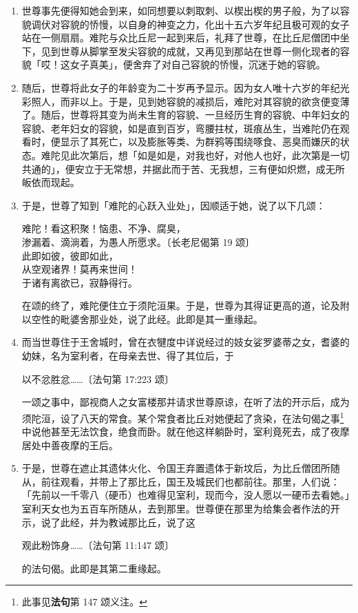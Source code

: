 \begin{enumerate}
\item 世尊事先便得知她会到来，如同想要以刺取刺、以楔出楔的男子般，为了以容貌调伏对容貌的㤭慢，以自身的神变之力，化出十五六岁年纪且极可观的女子站在一侧扇扇。难陀与众比丘尼一起到来后，礼拜了世尊，在比丘尼僧团中坐下，见到世尊从脚掌至发尖容貌的成就，又再见到那站在世尊一侧化现者的容貌「哎！这女子真美」，便舍弃了对自己容貌的㤭慢，沉迷于她的容貌。
\item 随后，世尊将此女子的年龄变为二十岁再予显示。因为女人唯十六岁的年纪光彩照人，而非以上。于是，见到她容貌的减损后，难陀对其容貌的欲贪便变薄了。随后，世尊将其变为尚未生育的容貌、一旦经历生育的容貌、中年妇女的容貌、老年妇女的容貌，如是直到百岁，弯腰拄杖，斑痕丛生，当难陀仍在观看时，便显示了其死亡，以及膨胀等类、为群鸦等围绕啄食、恶臭而嫌厌的状态。难陀见此次第后，想「如是如是，对我也好，对他人也好，此次第是一切共通的」，便安立于无常想，并据此而于苦、无我想，三有便如炽燃，成无所皈依而现起。
\item 于是，世尊了知到「难陀的心跃入业处」，因顺适于她，说了以下几颂：\begin{quoting}难陀！看这积聚！恼患、不净、腐臭，\\渗漏着、滴淌着，为愚人所愿求。{\bluefootnotesize 〔长老尼偈第 19 颂〕}\\此即如彼，彼即如此，\\从空观诸界！莫再来世间！\\于诸有离欲已，寂静得行。\end{quoting}在颂的终了，难陀便住立于须陀洹果。于是，世尊为其得证更高的道，论及附以空性的毗婆舍那业处，说了此经。此即是其一重缘起。
\item 而当世尊住于王舍城时，曾在衣犍度中详说经过的妓女娑罗婆蒂之女，耆婆的幼妹，名为室利者，在母亲去世、得了其位后，于\begin{quoting}以不忿胜忿……{\bluefootnotesize 〔法句第 17:223 颂〕}\end{quoting}一颂之事中，鄙视商人之女富楼那并请求世尊原谅，在听了法的开示后，成为须陀洹，设了八天的常食。某个常食者比丘对她便起了贪染，在法句偈之事\footnote{此事见\textbf{法句}第 147 颂义注。}中说他甚至无法饮食，绝食而卧。就在他这样躺卧时，室利竟死去，成了夜摩居处中善夜摩的王后。
\item 于是，世尊在遮止其遗体火化、令国王弃置遗体于新坟后，为比丘僧团所随从，前往观看，并带上了那比丘，国王及城民们也都前往。那里，人们说：「先前以一千零八（硬币）也难得见室利，现而今，没人愿以一硬币去看她。」室利天女也为五百车所随从，去到那里。世尊便在那里为给集会者作法的开示，说了此经，并为教诫那比丘，说了这\begin{quoting}观此粉饰身……{\bluefootnotesize 〔法句第 11:147 颂〕}\end{quoting}的法句偈。此即是其第二重缘起。\end{enumerate}

